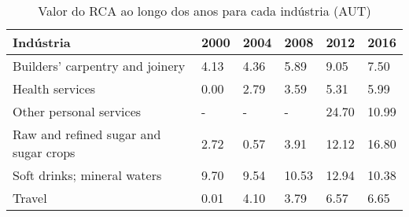 \begin{table}
\centering
\caption{Valor do RCA ao longo dos anos para cada indústria (AUT)}
\label{tab:ex3-tempo-AUT}
\begin{tabular}{p{6cm}p{1.5cm}p{1.5cm}p{1.5cm}p{1.5cm}p{1.5cm}}
\toprule
                            Indústria & 2000 & 2004 &  2008 &  2012 &  2016 \\
\midrule
      Builders' carpentry and joinery & 4.13 & 4.36 &  5.89 &  9.05 &  7.50 \\
                      Health services & 0.00 & 2.79 &  3.59 &  5.31 &  5.99 \\
              Other personal services &    - &    - &     - & 24.70 & 10.99 \\
Raw and refined sugar and sugar crops & 2.72 & 0.57 &  3.91 & 12.12 & 16.80 \\
          Soft drinks; mineral waters & 9.70 & 9.54 & 10.53 & 12.94 & 10.38 \\
                               Travel & 0.01 & 4.10 &  3.79 &  6.57 &  6.65 \\
\bottomrule
\end{tabular}
\end{table}
